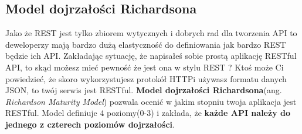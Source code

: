 \documentclass[oneside,polski,logo,indent]{amuthesis}
\begin{document}
\begin{center}
\section{Model dojrzałości Richardsona}
\end{center}

Jako że REST jest tylko zbiorem wytycznych i dobrych rad dla tworzenia API to deweloperzy mają bardzo dużą elastyczność do definiowania jak bardzo REST będzie ich API. Zakładając sytuację, że napisałeś sobie prostą aplikację RESTful API, to skąd możesz mieć pewność że jest ona w stylu REST ? Ktoś może Ci powiedzieć, że skoro wykorzystujesz protokół HTTP\break i używasz formatu danych JSON, to twój serwis jest RESTful. \textbf{Model dojrzałości Richardsona}(ang. \emph{Richardson Maturity Model}) pozwala ocenić w jakim stopniu twoja aplikacja jest RESTful. Model definiuje 4 poziomy(0-3) i zakłada, że \textbf{każde API należy do jednego z czterech poziomów dojrzałości}.
\end{document}
